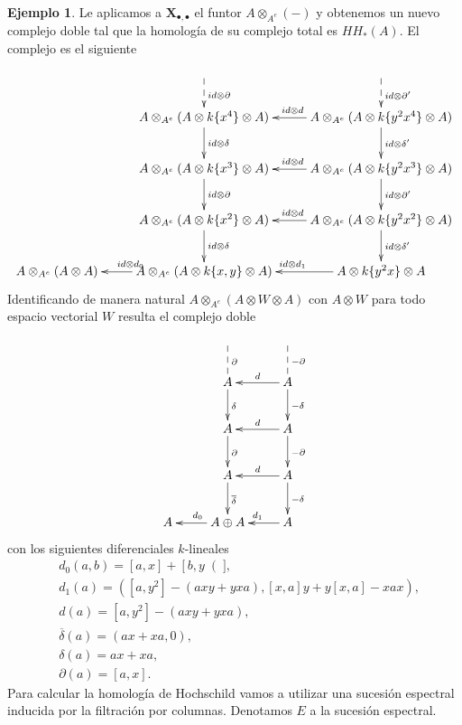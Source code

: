 \documentclass[a4paper,oneside,fleqn,11pt]{report}
\newcommand\ox{\otimes}
\theoremstyle{definition}
\theoremstyle{definition}
\newtheorem{example}{Ejemplo}[section]
\numberwithin{prop}{subsection}
\begin{document}
\begin{example}
Le aplicamos a $\mathbf{X}_{\bullet,\bullet}$ el funtor $A \ox_{A^e}(-)$ y obtenemos un nuevo
complejo doble tal que la homología de su complejo total es $HH_*(A)$. El complejo es el siguiente
\begin{align*}
\xymatrix{
	& & \\
	& A \ox_{A^e} (A \ox k\{x^4\} \ox A) \ar[d]^{id\ox\delta} \ar@{<--}[u]_{id\ox\partial}
		& A \ox_{A^e} (A \ox k\{y^2x^4\} \ox A) \ar[l]_{id\ox d} \ar[d]^{id\ox\delta'} \ar@{<--}[u]_{id\ox\partial'} \\
	& A \ox_{A^e} (A \ox k\{x^3\} \ox A) \ar[d]^{id\ox\partial}
		& A \ox_{A^e} (A \ox k\{y^2x^3\} \ox A) \ar[l]_{id\ox d} \ar[d]^{id\ox\partial'} \\
	& A \ox_{A^e} (A \ox k\{x^2\} \ox A) \ar[d]^{id\ox\delta}
		& A \ox_{A^e} (A \ox k \{y^2x^2\} \ox A) \ar[l]_{id\ox d} \ar[d]^{id\ox\delta'} \\
	A \ox_{A^e} (A \ox A) & A \ox_{A^e} (A \ox k\{x, y\} \ox A) \ar[l]_{id\ox d_0} & A \ox k \{y^2x\} \ox A \ar[l]_{id\ox d_1} \\
}
\end{align*}
Identificando de manera natural $A \ox_{A^e} (A \ox W \ox A)$ con $A \ox W$ para todo espacio vectorial $W$ resulta
el complejo doble
\begin{align*}
\xymatrix{
	& & \\
	& A \ar[d]^{\delta} \ar@{--}[u]_{\partial} & A\ar[l]_{d} \ar[d]^{-\delta} \ar@{--}[u]_{-\partial} \\
	& A \ar[d]^{\partial} & A \ar[l]_{d} \ar[d]^{-\partial} \\
	& A \ar[d]^{\overline{\delta}} & A \ar[l]_{d} \ar[d]^{-\delta} \\
	A & A \oplus A \ar[l]_{d_0} & A \ar[l]_{d_1} \\
}
\end{align*}
con los siguientes diferenciales $k$-lineales
\begin{align*}
&d_0(a,b) = \left[a,x\right] + \left[b,y\right(],\\
&d_1(a) = (\left[a,y^2\right] - (axy + yxa), \left[x,a\right]y + y\left[x,a\right] - xax),\\
&d(a) = \left[a,y^2\right] - (axy + yxa),\\
&\overline{\delta}(a) = (ax + xa, 0),\\
&\delta(a) = ax + xa,\\
&\partial(a) = \left[a, x\right].
\end{align*}
Para calcular la homología de Hochschild vamos a utilizar una sucesión espectral inducida por la filtración por columnas.
Denotamos $E$ a la sucesión espectral.



\end{example}
\end{document}
